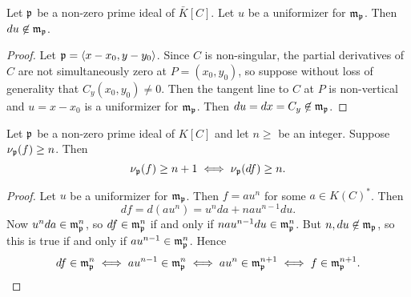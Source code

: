 \begin{lemma}
  \label{lem_differential_of_uniformizer}
  Let $\frak p$ be a non-zero prime ideal of $\bar K[C]$.
  Let $u$ be a uniformizer for $\frak m_{\frak p}$.
  Then $du \not \in \frak m_{\frak p}$.
\end{lemma}
\begin{proof}
  Let $\frak p = \left\langle x - x_0, y - y_0 \right\rangle$.
  Since $C$ is non-singular, the partial derivatives of $C$ are not simultaneously zero at $P = (x_0, y_0)$,
  so suppose without loss of generality that $C_y(x_0, y_0) \neq 0$.
  Then the tangent line to $C$ at $P$ is non-vertical and $u = x - x_0$ is a uniformizer for $\frak m_{\frak p}$.
  Then $du = dx = C_y \not\in \frak m_{\frak p}$.
\end{proof}
\begin{theorem}
  \label{thm_differential_increases_order}
  Let $\frak p$ be a non-zero prime ideal of $K[C]$ and let $n \geq $ be an integer.
  Suppose $\nu_{\frak p}(f) \geq n$. Then
  \[ \nu_{\frak p}(f) \geq n + 1 \iff \nu_{\frak p}(df) \geq n. \]
\end{theorem}
\begin{proof}
  Let $u$ be a uniformizer for $\frak m_{\frak p}$.
  Then $f = au^n$ for some $a \in K(C)^*$. Then
  \[ df = d(au^n) = u^nda + nau^{n-1}du. \]
  Now $u^nda \in \frak m_{\frak p}^n$,
  so $df \in \frak m_{\frak p}^n$ if and only if $nau^{n-1}du \in \frak m_{\frak p}^n$.
  But $n, du \not\in \frak m_{\frak p}$,
  so this is true if and only if $au^{n-1} \in \frak m_{\frak p}^n$. Hence
  \[ df \in \frak m_{\frak p}^n
    \iff au^{n-1} \in \frak m_{\frak p}^n
    \iff au^n \in \frak m_{\frak p}^{n+1}
    \iff f \in \frak m_{\frak p}^{n+1}. \qedhere \]
\end{proof}
